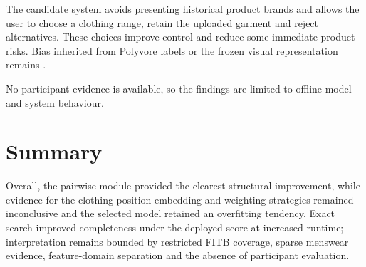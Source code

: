 The candidate system avoids presenting historical product brands and allows the
user to choose a clothing range, retain the uploaded garment and reject
alternatives. These choices improve control and reduce some immediate product
risks. Bias inherited from Polyvore labels or the frozen visual representation
remains \parencite{mehrabi2021bias,selbst2019fairness}.

No participant evidence is available, so the findings are limited to offline
model and system behaviour.

\section{Summary}

Overall, the pairwise module provided the clearest structural improvement,
while evidence for the clothing-position embedding and weighting strategies
remained inconclusive and the selected model retained an overfitting tendency.
Exact search improved completeness under the deployed score at increased
runtime; interpretation remains bounded by restricted FITB coverage, sparse
menswear evidence, feature-domain separation and the absence of participant
evaluation.
